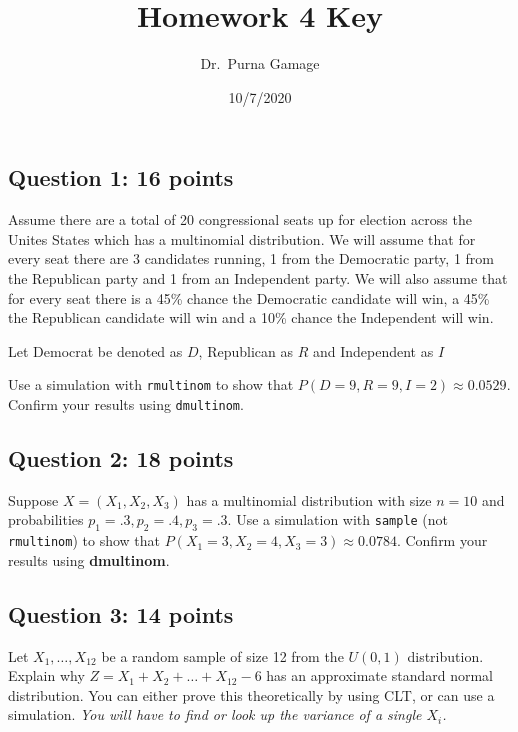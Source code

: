 \documentclass[
]{article}
\title{Homework 4 Key}
\author{Dr.~Purna Gamage}
\date{10/7/2020}
\begin{document}
\maketitle

\hypertarget{question-1-16-points}{%
\subsection{Question 1: 16 points}\label{question-1-16-points}}

Assume there are a total of 20 congressional seats up for election
across the Unites States which has a multinomial distribution. We will
assume that for every seat there are 3 candidates running, 1 from the
Democratic party, 1 from the Republican party and 1 from an Independent
party. We will also assume that for every seat there is a 45\% chance
the Democratic candidate will win, a 45\% the Republican candidate will
win and a 10\% chance the Independent will win.

Let Democrat be denoted as \(D\), Republican as \(R\) and Independent as
\(I\)

Use a simulation with \texttt{rmultinom} to show that
\(P(D = 9, R = 9, I = 2) \approx 0.0529\). Confirm your results using
\texttt{dmultinom}.

\hypertarget{question-2-18-points}{%
\subsection{Question 2: 18 points}\label{question-2-18-points}}

Suppose \(X = (X_1,X_2,X_3)\) has a multinomial distribution with size
\(n = 10\) and probabilities \(p_1 = .3, p_2 = .4, p_3 = .3\). Use a
simulation with \texttt{sample} (not \texttt{rmultinom}) to show that
\(P(X_1 = 3, X_2 = 4, X_3 = 3) \approx 0.0784\). Confirm your results
using \textbf{dmultinom}.

\hypertarget{question-3-14-points}{%
\subsection{Question 3: 14 points}\label{question-3-14-points}}

Let \(X_1, \dots, X_{12}\) be a random sample of size 12 from the
\(U(0,1)\) distribution. Explain why
\(Z = X_1 + X_2 + \dots + X_{12} - 6\) has an approximate standard
normal distribution. You can either prove this theoretically by using
CLT, or can use a simulation.
\textit{You will have to find or look up the variance of a single $X_i$.}
\end{document}
